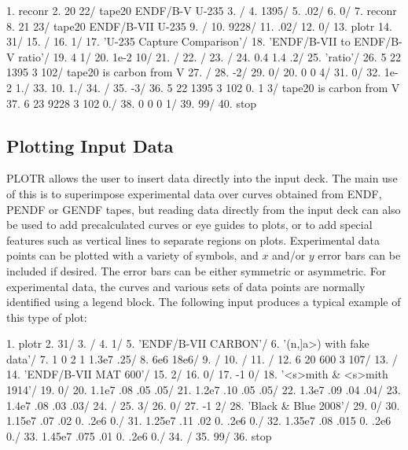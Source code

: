 \small
\begin{ccode}
  1. reconr
  2. 20 22/ tape20 ENDF/B-V U-235
  3. /
  4. 1395/
  5. .02/
  6. 0/
  7. reconr
  8. 21 23/ tape20 ENDF/B-VII U-235
  9. /
 10. 9228/
 11. .02/
 12. 0/
 13. plotr
 14. 31/
 15. /
 16. 1/
 17. 'U-235 Capture Comparison'/
 18. 'ENDF/B-VII to ENDF/B-V ratio'/
 19. 4 1/
 20. 1e-2 10/
 21. /
 22. /
 23. /
 24. 0.4 1.4 .2/
 25. 'ratio'/
 26. 5 22 1395 3 102/ tape20 is carbon from V
 27. /
 28. -2/
 29. 0/
 20. 0 0 4/
 31. 0/
 32. 1e-2 1./
 33. 10. 1./
 34. /
 35. -3/
 36. 5 22 1395 3 102 0. 1 3/ tape20 is carbon from V
 37. 6 23 9228 3 102 0./
 38. 0 0 0 1/
 39. 99/
 40. stop
\end{ccode}
\normalsize


\subsection{Plotting Input Data}
\label{ssPLOTR_inp_data}

PLOTR allows the user to insert data directly into the input deck.
The main use of this is to superimpose experimental data over curves
obtained from ENDF, PENDF or GENDF tapes, but reading data directly
from the input deck can also be used to add precalculated curves or
eye guides to plots, or to add special features such as vertical lines
to separate regions on plots.  Experimental data points can be plotted
with a variety of symbols, and $x$ and/or $y$ error bars can be included
if desired.  The error bars can be either symmetric or asymmetric.  For
experimental data, the curves and various sets of data points are
normally identified using a legend block.  The following input produces
a typical example of this type of plot:

\small
\begin{ccode}

   1.  plotr
   2.  31/
   3.  /
   4.  1/
   5.  'ENDF/B-VII CARBON'/
   6.  '(n,]a>) with fake data'/
   7.  1 0 2 1 1.3e7 .25/
   8.  6e6 18e6/
   9.  /
  10.  /
  11.  /
  12.  6 20 600 3 107/
  13.  /
  14.  'ENDF/B-VII MAT 600'/
  15.  2/
  16.  0/
  17.  -1 0/
  18.  '<s>mith & <s>mith 1914'/
  19.  0/
  20.  1.1e7 .08 .05 .05/
  21.  1.2e7 .10 .05 .05/
  22.  1.3e7 .09 .04 .04/
  23.  1.4e7 .08 .03 .03/
  24.  /
  25.  3/
  26.  0/
  27.  -1 2/
  28.  'Black & Blue 2008'/
  29.  0/
  30.  1.15e7 .07 .02 0. .2e6 0./
  31.  1.25e7 .11 .02 0. .2e6 0./
  32.  1.35e7 .08 .015 0. .2e6 0./
  33.  1.45e7 .075 .01 0. .2e6 0./
  34.  /
  35.  99/
  36.  stop

\end{ccode}
\normalsize


